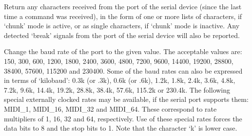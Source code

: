   \objListArgEnd

\objItemInlet{\nothing}

  \objListIOBegin
  \objListIOEnd

\objItemOutlet{\nothing}

  \objListIOBegin



  \objListIOEnd






\objItemCommands[]

  \objListCmdBegin

  Return any characters received from the port of the serial device (since the last time a
   command was received), in the form of one or more lists of characters, if
  `chunk' mode is active, or as single characters, if `chunk' mode is inactive.
  Any detected `break' signals from the port of the serial device will also be reported.

  Change the baud rate of the port to the given value.
  The acceptable values are: 150, 300, 600, 1200, 1800, 2400, 3600, 4800, 7200, 9600, 14400,
  19200, 28800, 38400, 57600, 115200 and 230400.
  Some of the baud rates can also be expressed in terms of `kilobaud': 0.3k (or .3k), 0.6k
  (or .6k), 1.2k, 1.8k, 2.4k, 3.6k, 4.8k, 7.2k, 9.6k, 14.4k, 19.2k, 28.8k, 38.4k, 57.6k,
  115.2k or 230.4k.
  The following special externally clocked rates may be available, if the serial port supports them:
  MIDI\_1, MIDI\_16, MIDI\_32 and MIDI\_64.
  These correspond to rate multipliers of 1, 16, 32 and 64, respectively.
  Use of these special rates forces the data bits to 8 and the stop bits to 1.
  Note that the character `k' is lower case.

